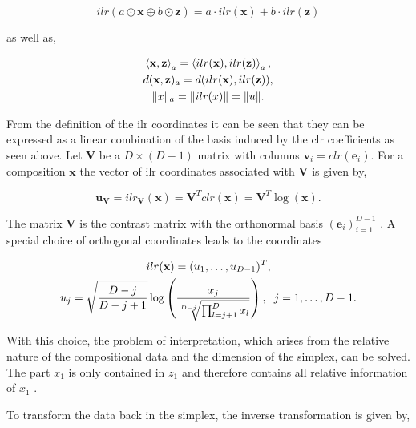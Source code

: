 \begin{equation*}
ilr(a \odot \textbf{x} \oplus b \odot \textbf{z}) = a \cdot ilr(\textbf{x}) + b \cdot ilr(\textbf{z})
\label{eq:ilr coordinates isomorph}
\end{equation*}

as well as,

\begin{gather*}
\left\langle  \textbf{x},\textbf{z} \right\rangle_a = \left\langle  ilr(\textbf{x}), ilr(\textbf{z}) \right\rangle_a, \\
d(\textbf{x},\textbf{z})_a = d(ilr(\textbf{x}),ilr(\textbf{z})),\\
\lVert x\rVert_a = \lVert ilr(x)\rVert = \lVert u\rVert .
\label{eq:ilr coordinates isometric }
\end{gather*}


From the definition of the ilr coordinates it can be seen that they can be expressed as a linear combination of the basis induced by the clr coefficients as seen above. Let $\textbf{V}$ be a $D \times (D-1)$ matrix with columns $\textbf{v}_i = clr(\textbf{e}_i)$. For a composition $\textbf{x}$ the vector of ilr coordinates associated with $\textbf{V}$ is given by,

\begin{equation*}
\textbf{u}_{\textbf{V}} = ilr_{\textbf{V}}(\textbf{x}) = \textbf{V}^T clr(\textbf{x}) = \textbf{V}^T \log(\textbf{x}). 
\label{eq:ilr coordinates with V}
\end{equation*}

The matrix $\textbf{V}$ is the contrast matrix with the orthonormal basis $(\textbf{e}_i)_{i=1}^{D-1}$ \cite{Egozcue:2003}. A special choice of orthogonal coordinates leads to the coordinates 

\begin{gather*}
ilr(\textbf{x}) = (u_1,\ldots,u_{D-1})^T, \\
u_j = \sqrt{\frac{D-j}{D-j+1}}\log\left(\frac{x_j}{\sqrt[D-j]{\prod_{l=j+1}^D x_l}}\right), \hspace{0.2cm} j=1,\ldots, D-1 .
\label{eq:pivot coordinates}
\end{gather*}

With this choice, the problem of interpretation, which arises from the relative nature of the compositional data and the dimension of the simplex, can be solved. The part $x_1$ is only contained in $z_1$ and therefore contains all relative information of $x_1$ \cite{Filzmoser:2020}. 

To transform the data back in the simplex, the inverse transformation is given by, 

